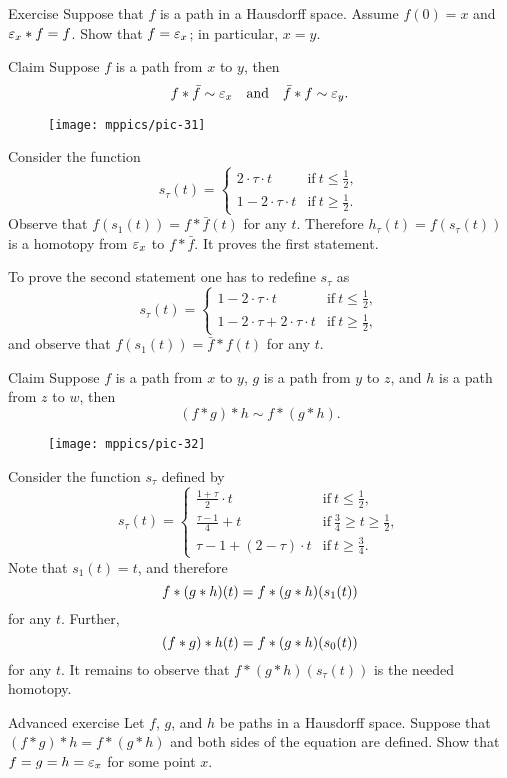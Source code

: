 \begin{thm}{Exercise}\label{ex:neutral}
Suppose that $f$ is a path in a Hausdorff space.
Assume $f(0)=x$ and $\varepsilon_x*f= f$.
Show that $f=\varepsilon_x$; in particular, $x=y$.
\end{thm}

\begin{thm}{Claim}\label{clm:f-bar-f}
Suppose $f$ is a path from $x$ to $y$, then
\[f*\bar f\sim \varepsilon_x
\quad\text{and}\quad
\bar f*f\sim \varepsilon_y.\]
\end{thm}

{

\begin{wrapfigure}[12]{r}{30mm}
\centering
\texttt{[image: mppics/pic-31]}
\end{wrapfigure}

Consider the function
\[s_\tau(t)=
\begin{cases}
2\cdot \tau \cdot t&\text{if}\ t\le \tfrac12,
\\
1-2\cdot \tau \cdot t&\text{if}\ t\ge \tfrac12.
\end{cases}
\]
Observe that $f(s_1(t))=f*\bar f(t)$ for any $t$.
Therefore $h_\tau(t)=f(s_\tau(t))$ is a homotopy from $\varepsilon_x$ to $f*\bar f$.
It proves the first statement.



To prove the second statement one has to redefine $s_\tau$ as
\[s_\tau(t)=
\begin{cases}
1-2\cdot \tau \cdot t&\text{if}\ t\le \tfrac12,
\\
1-2\cdot\tau + 2\cdot \tau \cdot t&\text{if}\ t\ge \tfrac12,
\end{cases}
\]
and observe that $f(s_1(t))=\bar f*f(t)$ for any $t$.
\qeds

}

\begin{thm}{Claim}\label{clm:assoc}
Suppose $f$ is a path from $x$ to $y$, 
$g$ is a path from $y$ to $z$,
and
$h$ is a path from $z$ to $w$,
then
\[(f*g)*h\sim f*(g*h).\]
\end{thm}

\begin{wrapfigure}[3]{r}{30mm}
\centering
\vskip-4mm
\texttt{[image: mppics/pic-32]}
\end{wrapfigure}

Consider the function $s_\tau$ defined by 
\[s_\tau(t)=
\begin{cases}
\tfrac{1+\tau}2\cdot t&\text{if}\ t\le \tfrac12,
\\
\tfrac{\tau-1}4+t&\text{if}\ \tfrac 34\ge t\ge \tfrac12,
\\
\tau-1+ (2-\tau)\cdot t&\text{if}\  t\ge \tfrac34.
\end{cases}
\]
Note that $s_1(t)=t$,
and therefore \[f*(g*h)(t)\z=f*(g*h)(s_1(t))\] for any $t$.
Further, 
\[(f*g)*h(t)\z=f*(g*h)(s_0(t))\] for any $t$.
It remains to observe that $f*(g*h)(s_\tau(t))$ is the needed homotopy.
\qeds

\begin{thm}{Advanced exercise}\label{ex:assoc}
Let $f$, $g$, and $h$ be paths in a Hausdorff space.
Suppose that $(f*g)*h= f*(g*h)$
and both sides of the equation are defined.
Show that $f=g=h=\varepsilon_x$ for some point $x$.
\end{thm}

